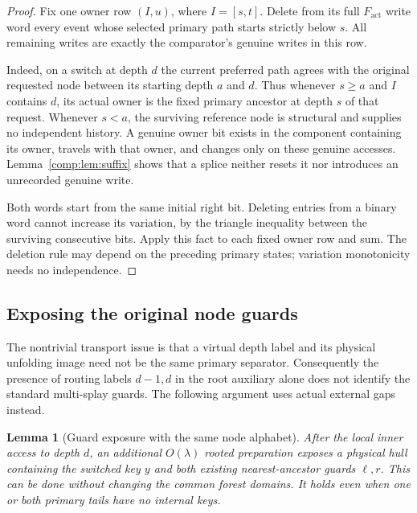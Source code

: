\documentclass[11pt]{article}
\numberwithin{equation}{section}
\newtheorem{lemma}[theorem]{Lemma}
\begin{document}
\begin{proof}
Fix one owner row $(I,u)$, where $I=[s,t]$. Delete from its full
$F_{\mathrm{act}}$ write word every event whose selected primary path
starts strictly below $s$. All remaining writes are exactly the
comparator's genuine writes in this row.

Indeed, on a switch at depth $d$ the current preferred path agrees
with the original requested node between its starting depth $a$ and
$d$. Thus whenever $s\ge a$ and $I$ contains $d$, its actual owner is
the fixed primary ancestor at depth $s$ of that request. Whenever
$s<a$, the surviving reference node is structural and supplies no
independent history. A genuine owner bit exists in the component
containing its owner, travels with that owner, and changes only on
these genuine accesses. Lemma~\ref{comp:lem:suffix} shows that a splice
neither resets it nor introduces an unrecorded genuine write.

Both words start from the same initial right bit. Deleting entries
from a binary word cannot increase its variation, by the triangle
inequality between the surviving consecutive bits. Apply this fact
to each fixed owner row and sum. The deletion rule may depend on the
preceding primary states; variation monotonicity needs no independence.
\end{proof}

\subsection{Exposing the original node guards}

The nontrivial transport issue is that a virtual depth label and its
physical unfolding image need not be the same primary separator.
Consequently the presence of routing labels $d-1,d$ in the root
auxiliary alone does not identify the standard multi-splay guards.
The following argument uses actual external gaps instead.

\begin{lemma}[Guard exposure with the same node alphabet]\label{comp:lem:guards}
After the local inner access to depth $d$, an additional $O(\lambda)$
rooted preparation exposes a physical hull containing the switched
key $y$ and both existing nearest-ancestor guards $\ell,r$. This can
be done without changing the common forest domains. It holds even
when one or both primary tails have no internal keys.
\end{lemma}
\end{document}
